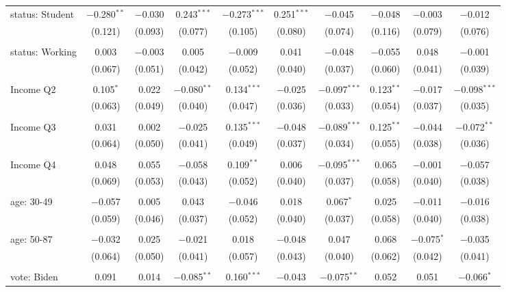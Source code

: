 \begin{tabular}{@{\extracolsep{5pt}}lccccccccc}
 status: Student & $-$0.280$^{**}$ & $-$0.030 & 0.243$^{***}$ & $-$0.273$^{***}$ & 0.251$^{***}$ & $-$0.045 & $-$0.048 & $-$0.003 & $-$0.012 \\ 
  & (0.121) & (0.093) & (0.077) & (0.105) & (0.080) & (0.074) & (0.116) & (0.079) & (0.076) \\ 
  & & & & & & & & & \\ 
 status: Working & 0.003 & $-$0.003 & 0.005 & $-$0.009 & 0.041 & $-$0.048 & $-$0.055 & 0.048 & $-$0.001 \\ 
  & (0.067) & (0.051) & (0.042) & (0.052) & (0.040) & (0.037) & (0.060) & (0.041) & (0.039) \\ 
  & & & & & & & & & \\ 
 Income Q2 & 0.105$^{*}$ & 0.022 & $-$0.080$^{**}$ & 0.134$^{***}$ & $-$0.025 & $-$0.097$^{***}$ & 0.123$^{**}$ & $-$0.017 & $-$0.098$^{***}$ \\ 
  & (0.063) & (0.049) & (0.040) & (0.047) & (0.036) & (0.033) & (0.054) & (0.037) & (0.035) \\ 
  & & & & & & & & & \\ 
 Income Q3 & 0.031 & 0.002 & $-$0.025 & 0.135$^{***}$ & $-$0.048 & $-$0.089$^{***}$ & 0.125$^{**}$ & $-$0.044 & $-$0.072$^{**}$ \\ 
  & (0.064) & (0.050) & (0.041) & (0.049) & (0.037) & (0.034) & (0.055) & (0.038) & (0.036) \\ 
  & & & & & & & & & \\ 
 Income Q4 & 0.048 & 0.055 & $-$0.058 & 0.109$^{**}$ & 0.006 & $-$0.095$^{***}$ & 0.065 & $-$0.001 & $-$0.057 \\ 
  & (0.069) & (0.053) & (0.043) & (0.052) & (0.040) & (0.037) & (0.058) & (0.040) & (0.038) \\ 
  & & & & & & & & & \\ 
 age: 30-49 & $-$0.057 & 0.005 & 0.043 & $-$0.046 & 0.018 & 0.067$^{*}$ & 0.025 & $-$0.011 & $-$0.016 \\ 
  & (0.059) & (0.046) & (0.037) & (0.052) & (0.040) & (0.037) & (0.058) & (0.040) & (0.038) \\ 
  & & & & & & & & & \\ 
 age: 50-87 & $-$0.032 & 0.025 & $-$0.021 & 0.018 & $-$0.048 & 0.047 & 0.068 & $-$0.075$^{*}$ & $-$0.035 \\ 
  & (0.064) & (0.050) & (0.041) & (0.057) & (0.043) & (0.040) & (0.062) & (0.042) & (0.041) \\ 
  & & & & & & & & & \\ 
 vote: Biden & 0.091 & 0.014 & $-$0.085$^{**}$ & 0.160$^{***}$ & $-$0.043 & $-$0.075$^{**}$ & 0.052 & 0.051 & $-$0.066$^{*}$ \\ 

\end{tabular}
